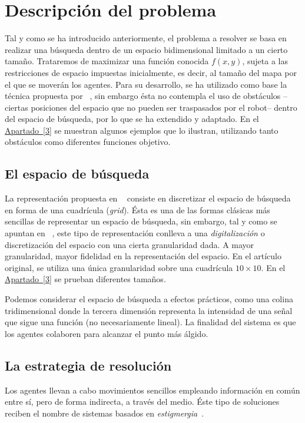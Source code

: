 \documentclass[runningheads]{llncs}
\newcommand{\refcruzada}[2]{\hyperref[#2]{#1~\ref{#2}}}
\begin{document}
    \section{Descripción del problema}
    \label{sec:descripcion}
    Tal y como se ha introducido anteriormente, el problema a resolver se basa en realizar una búsqueda dentro de un espacio bidimensional limitado a un cierto tamaño. Trataremos de maximizar una función conocida $f(x,y)$, sujeta a las restricciones de espacio impuestas inicialmente, es decir, al tamaño del mapa por el que se moverán los agentes.
    Para su desarrollo, se ha utilizado como base la técnica propuesta por ~\cite{initialPaper}, sin embargo ésta no contempla el uso de obstáculos --ciertas posiciones del espacio que no pueden ser traspasados por el robot-- dentro del espacio de búsqueda, por lo que se ha extendido y adaptado.
    En el \refcruzada{Apartado}{3} se muestran algunos ejemplos que lo ilustran, utilizando tanto obstáculos como diferentes funciones objetivo. %


    \subsection{El espacio de búsqueda}
    La representación propuesta en ~\cite{initialPaper} consiste en discretizar el espacio de búsqueda en forma de una cuadrícula (\textit{grid}). Ésta es una de las formas clásicas más sencillas de representar un espacio de búsqueda, sin embargo, tal y como se apuntan en ~\cite{AIRobotics}, este tipo de representación conlleva a una \textit{digitalización} o discretización del espacio con una cierta granularidad dada. A mayor granularidad, mayor fidelidad en la representación del espacio. En el artículo original, se utiliza una única granularidad sobre una cuadrícula $10 \times 10$. En el \refcruzada{Apartado}{3} se prueban diferentes tamaños. %

    Podemos considerar el espacio de búsqueda a efectos prácticos, como una colina tridimensional donde la tercera dimensión representa la intensidad de una señal que sigue una función (no necesariamente lineal). La finalidad del sistema es que los agentes colaboren para alcanzar el punto más álgido.

    \subsection{La estrategia de resolución}

    Los agentes llevan a cabo movimientos sencillos empleando información en común entre sí, pero de forma indirecta, a través del medio. Éste tipo de soluciones reciben el nombre de sistemas basados en \textit{estigmergia}~\cite{stigmergy}.
    
\end{document}
